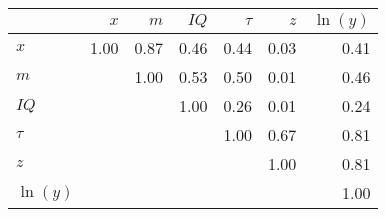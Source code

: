 \begin{tabular}{lrrrrrr}
\hline
 & $x$  & $m$  & $IQ$  & $\tau$  & $z$  & $\ln(y)$  \\ 
\hline
$x$ & 1.00  & 0.87  & 0.46  & 0.44  & 0.03  & 0.41  \\ 
$m$ &   & 1.00  & 0.53  & 0.50  & 0.01  & 0.46  \\ 
$IQ$ &   &   & 1.00  & 0.26  & 0.01  & 0.24  \\ 
$\tau$ &   &   &   & 1.00  & 0.67  & 0.81  \\ 
$z$ &   &   &   &   & 1.00  & 0.81  \\ 
$\ln(y)$ &   &   &   &   &   & 1.00  \\ 
\hline
\end{tabular}%
